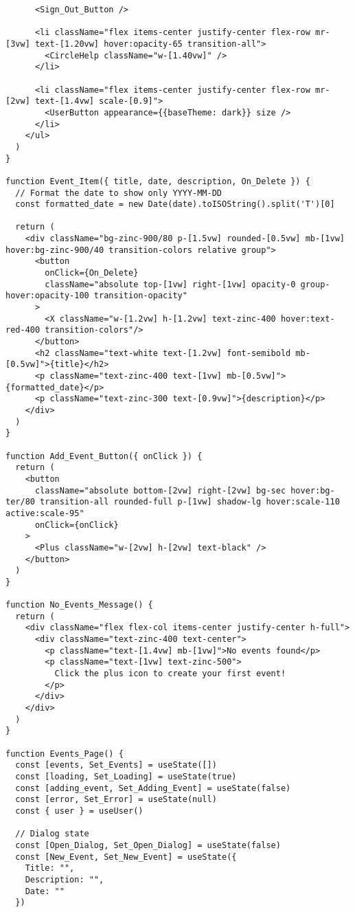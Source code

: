 \begin{verbatim}
      <Sign_Out_Button />

      <li className="flex items-center justify-center flex-row mr-[3vw] text-[1.20vw] hover:opacity-65 transition-all">
        <CircleHelp className="w-[1.40vw]" />
      </li>

      <li className="flex items-center justify-center flex-row mr-[2vw] text-[1.4vw] scale-[0.9]">
        <UserButton appearance={{baseTheme: dark}} size />
      </li>
    </ul>
  )
}

function Event_Item({ title, date, description, On_Delete }) {
  // Format the date to show only YYYY-MM-DD
  const formatted_date = new Date(date).toISOString().split('T')[0]

  return (
    <div className="bg-zinc-900/80 p-[1.5vw] rounded-[0.5vw] mb-[1vw] hover:bg-zinc-900/40 transition-colors relative group">
      <button
        onClick={On_Delete}
        className="absolute top-[1vw] right-[1vw] opacity-0 group-hover:opacity-100 transition-opacity"
      >
        <X className="w-[1.2vw] h-[1.2vw] text-zinc-400 hover:text-red-400 transition-colors"/>
      </button>
      <h2 className="text-white text-[1.2vw] font-semibold mb-[0.5vw]">{title}</h2>
      <p className="text-zinc-400 text-[1vw] mb-[0.5vw]">{formatted_date}</p>
      <p className="text-zinc-300 text-[0.9vw]">{description}</p>
    </div>
  )
}

function Add_Event_Button({ onClick }) {
  return (
    <button
      className="absolute bottom-[2vw] right-[2vw] bg-sec hover:bg-ter/80 transition-all rounded-full p-[1vw] shadow-lg hover:scale-110 active:scale-95"
      onClick={onClick}
    >
      <Plus className="w-[2vw] h-[2vw] text-black" />
    </button>
  )
}

function No_Events_Message() {
  return (
    <div className="flex flex-col items-center justify-center h-full">
      <div className="text-zinc-400 text-center">
        <p className="text-[1.4vw] mb-[1vw]">No events found</p>
        <p className="text-[1vw] text-zinc-500">
          Click the plus icon to create your first event!
        </p>
      </div>
    </div>
  )
}

function Events_Page() {
  const [events, Set_Events] = useState([])
  const [loading, Set_Loading] = useState(true)
  const [adding_event, Set_Adding_Event] = useState(false)
  const [error, Set_Error] = useState(null)
  const { user } = useUser()

  // Dialog state
  const [Open_Dialog, Set_Open_Dialog] = useState(false)
  const [New_Event, Set_New_Event] = useState({
    Title: "",
    Description: "",
    Date: ""
  })


\end{verbatim}
